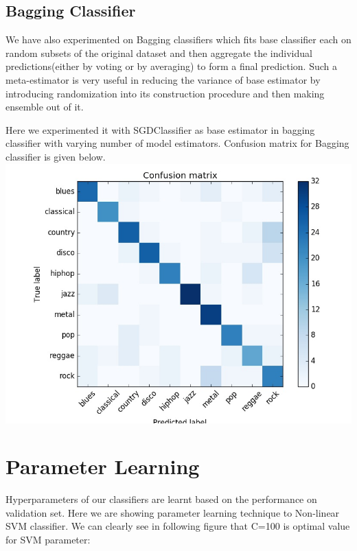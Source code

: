 \documentclass[conference]{IEEEtran}
\begin{document}
\subsection{Bagging Classifier}
\label{sub:Baagging Classification}
We have also experimented on Bagging classifiers which fits base classifier each on random subsets of the original dataset and then aggregate the individual predictions(either by voting or by averaging) to form a final prediction. Such a meta-estimator is very useful in reducing the variance of base estimator by introducing randomization into its construction procedure and then making ensemble out of it.

Here we experimented it with SGDClassifier as base estimator in bagging classifier with varying number of model estimators.
Confusion matrix for Bagging classifier is given below.
\includegraphics[width=\columnwidth]{BAGGING}

\section{Parameter Learning}
\label{sec:Results}

Hyperparameters of our classifiers are learnt based on the performance on validation set. Here we are showing parameter learning technique to Non-linear SVM classifier. We can clearly see in following figure that C=100 is optimal value for SVM parameter:
\end{document}
